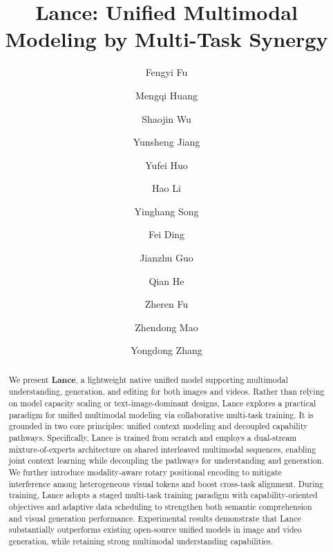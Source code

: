 \documentclass{llmxive}
\title{Lance: Unified Multimodal Modeling by Multi-Task Synergy}
\author{Fengyi Fu \and Mengqi Huang \and Shaojin Wu \and Yunsheng Jiang \and Yufei Huo \and Hao Li \and Yinghang Song \and Fei Ding \and Jianzhu Guo \and Qian He \and Zheren Fu \and Zhendong Mao \and Yongdong Zhang}
\begin{document}
\maketitle
\begin{abstract}
We present \textbf{Lance}, a lightweight native unified model supporting multimodal understanding, generation, and editing for both images and videos. Rather than relying on model capacity scaling or text-image-dominant designs, Lance explores a practical paradigm for unified multimodal modeling via collaborative multi-task training. It is grounded in two core principles: unified context modeling and decoupled capability pathways. Specifically, Lance is trained from scratch and employs a dual-stream mixture-of-experts architecture on shared interleaved multimodal sequences, enabling joint context learning while decoupling the pathways for understanding and generation. We further introduce modality-aware rotary positional encoding to mitigate interference among heterogeneous visual tokens and boost cross-task alignment. During training, Lance adopts a staged multi-task training paradigm with capability-oriented objectives and adaptive data scheduling to strengthen both semantic comprehension and visual generation performance. Experimental results demonstrate that Lance substantially outperforms existing open-source unified models in image and video generation, while retaining strong multimodal understanding capabilities.
\end{abstract}
\setcounter{figure}{0}
\label{fig:benchmark_comparison}

\edef\benchmarkFigNumber{\thefigure}




\vspace*{-2.5em}
{
\centering

\par
}
\vspace{-1em}

% 

\end{document}
